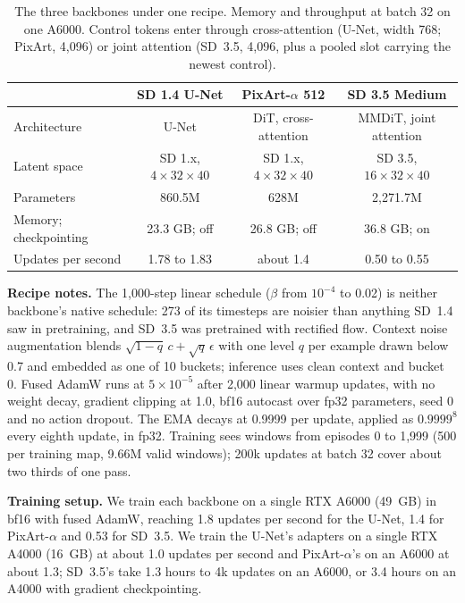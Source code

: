 \begin{table}[ht]
\centering\footnotesize\setlength{\tabcolsep}{3pt}
\caption{The three backbones under one recipe. Memory and throughput at batch 32 on one A6000. Control tokens enter through cross-attention (U-Net, width 768; PixArt, 4,096) or joint attention (SD~3.5, 4,096, plus a pooled slot carrying the newest control).}
\label{tab:recipe}
\begin{tabular}{lccc}
\toprule
 & SD 1.4 U-Net & PixArt-$\alpha$ 512 & SD 3.5 Medium \\
\midrule
Architecture & U-Net & DiT, cross-attention & MMDiT, joint attention \\
Latent space & SD 1.x, $4\times32\times40$ & SD 1.x, $4\times32\times40$ & SD 3.5, $16\times32\times40$ \\
Parameters & 860.5M & 628M & 2,271.7M \\
Memory; checkpointing & 23.3 GB; off & 26.8 GB; off & 36.8 GB; on \\
Updates per second & 1.78 to 1.83 & about 1.4 & 0.50 to 0.55 \\
\bottomrule
\end{tabular}
\end{table}

\textbf{Recipe notes.} The 1,000-step linear schedule ($\beta$ from $10^{-4}$ to 0.02) is neither backbone's native schedule: 273 of its timesteps are noisier than anything SD~1.4 saw in pretraining, and SD~3.5 was pretrained with rectified flow. Context noise augmentation blends $\sqrt{1-q}\,c+\sqrt{q}\,\epsilon$ with one level $q$ per example drawn below 0.7 and embedded as one of 10 buckets; inference uses clean context and bucket 0. Fused AdamW runs at $5\times10^{-5}$ after 2,000 linear warmup updates, with no weight decay, gradient clipping at 1.0, bf16 autocast over fp32 parameters, seed 0 and no action dropout. The EMA decays at 0.9999 per update, applied as $0.9999^8$ every eighth update, in fp32. Training sees windows from episodes 0 to 1,999 (500 per training map, 9.66M valid windows); 200k updates at batch 32 cover about two thirds of one pass.

\textbf{Training setup.} We train each backbone on a single RTX A6000 (49~GB) in bf16 with fused AdamW, reaching 1.8 updates per second for the U-Net, 1.4 for PixArt-$\alpha$ and 0.53 for SD~3.5. We train the U-Net's adapters on a single RTX A4000 (16~GB) at about 1.0 updates per second and PixArt-$\alpha$'s on an A6000 at about 1.3; SD~3.5's take 1.3 hours to 4k updates on an A6000, or 3.4 hours on an A4000 with gradient checkpointing.

